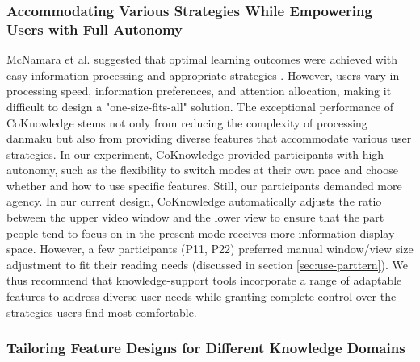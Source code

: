\subsubsection{Accommodating Various Strategies While Empowering Users with Full Autonomy}
\label{sec:7.2.2}
McNamara et al. suggested that optimal learning outcomes were achieved with easy information processing and appropriate strategies \cite{mcnamara2009toward}. However, users vary in processing speed, information preferences, and attention allocation, making it difficult to design a "one-size-fits-all" solution. The exceptional performance of CoKnowledge stems not only from reducing the complexity of processing danmaku but also from providing diverse features that accommodate various user strategies. In our experiment, CoKnowledge provided participants with high autonomy, such as the flexibility to switch modes at their own pace and choose whether and how to use specific features. 
Still, our participants demanded more agency. In our current design, CoKnowledge automatically adjusts the ratio between the upper video window and the lower view to
ensure that the part people tend to focus on in the present mode receives more information display space. 
However, a few participants (P11, P22) preferred manual window/view size adjustment to fit their reading needs (discussed in section \ref{sec:use-parttern}). 
We thus recommend that knowledge-support tools incorporate a range of adaptable features to address diverse user needs while granting complete control over the strategies users find most comfortable.

\subsubsection{Tailoring Feature Designs for Different Knowledge Domains}

